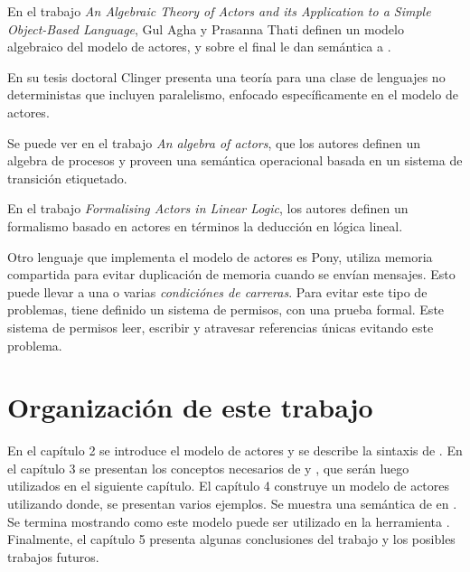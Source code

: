 En el trabajo \textit{An Algebraic Theory of Actors and its Application to a Simple Object-Based Language}\cite{apicalculus}, Gul Agha y Prasanna Thati definen un modelo algebraico del modelo de actores, y sobre el final le dan semántica a \SAL.

En su tesis doctoral Clinger\cite{Clinger:1981} presenta una teoría para una clase de lenguajes no deterministas que incluyen paralelismo, enfocado específicamente en el modelo de actores.

Se puede ver en el trabajo \textit{An algebra of actors}\cite{algebraActors}, que los autores definen un algebra de procesos y proveen una semántica operacional basada en un sistema de transición etiquetado.

En el trabajo \textit{Formalising Actors in Linear Logic}\cite{actorLiniarLogic}, los autores definen un formalismo basado en actores en términos la deducción en lógica lineal.

Otro lenguaje que implementa el modelo de actores es Pony\cite{ponylang}, utiliza memoria compartida para evitar duplicación de memoria cuando se envían mensajes. Esto puede llevar a una o varias \textit{condiciónes de carreras}. Para evitar este tipo de problemas, tiene definido un sistema de permisos, con una prueba formal\cite{Clebsch:2015:DCS:2824815.2824816}. Este sistema de permisos leer, escribir y atravesar referencias únicas evitando este problema.

\section{Organización de este trabajo}

En el capítulo 2 se introduce el modelo de actores y se describe la sintaxis de \SAL. En el capítulo 3 se presentan los conceptos necesarios de \CSP y \CSPm, que serán luego utilizados en el siguiente capítulo. El capítulo 4 construye un modelo de actores utilizando \CSP donde, se presentan varios ejemplos. Se muestra una semántica de \SAL en \CSP. Se termina mostrando como este modelo puede ser utilizado en la herramienta \FDR. Finalmente, el capítulo 5 presenta algunas conclusiones del trabajo y los posibles trabajos futuros.
